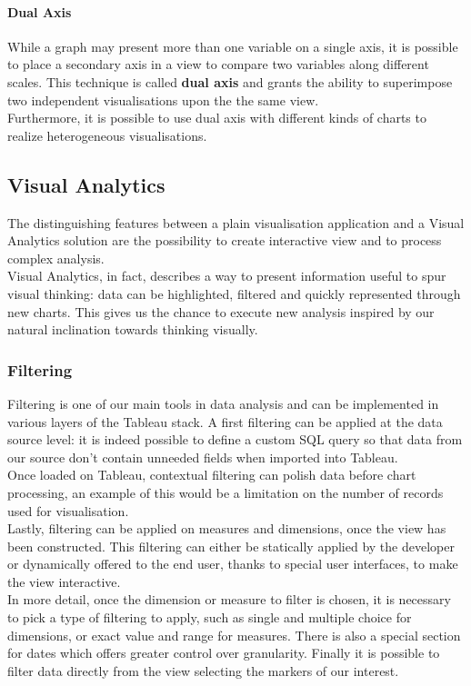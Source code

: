 \paragraph{Dual Axis}
While a graph may present more than one variable on a single axis, it is possible to place a secondary axis in a view to compare two variables along different scales. This technique is called \textbf{dual axis} and grants the ability to superimpose two independent visualisations upon the the same view.\\
Furthermore, it is possible to use dual axis with different kinds of charts to realize heterogeneous visualisations.

\subsection{Visual Analytics}

The distinguishing features between a plain visualisation application and a Visual Analytics solution are the possibility to create interactive view and to process complex analysis.\\
Visual Analytics, in fact, describes a way to present information useful to spur visual thinking: data can be highlighted, filtered and quickly represented through new charts. This gives us the chance to execute new analysis inspired by our natural inclination towards thinking visually.

\subsubsection{Filtering}

Filtering is one of our main tools in data analysis and can be implemented in various layers of the Tableau stack.
A first filtering can be applied at the data source level: it is indeed possible to define a custom SQL query so that data from our source don't contain unneeded fields when imported into Tableau.\\
Once loaded on Tableau, contextual filtering can polish data before chart processing, an example of this would be a limitation on the number of records used for visualisation.\\
Lastly, filtering can be applied on measures and dimensions, once the view has been constructed. This filtering can either be statically applied by the developer or dynamically offered to the end user, thanks to special user interfaces, to make the view interactive.
\\
In more detail, once the dimension or measure to filter is chosen, it is necessary to pick a type of filtering to apply, such as single and multiple choice for dimensions, or exact value and range for measures. There is also a special section for dates which offers greater control over granularity.
Finally it is possible to filter data directly from the view selecting the markers of our interest.

